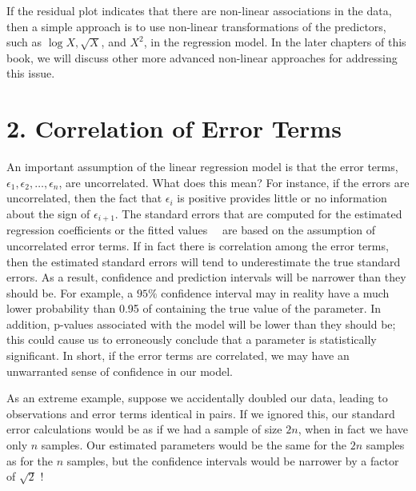 \documentclass[10pt]{article}
\begin{document}
If the residual plot indicates that there are non-linear associations in the data, then a simple approach is to use non-linear transformations of the predictors, such as $\log X, \sqrt{X}$, and $X^{2}$, in the regression model. In the later chapters of this book, we will discuss other more advanced non-linear approaches for addressing this issue.

\section*{2. Correlation of Error Terms}
An important assumption of the linear regression model is that the error terms, $\epsilon_{1}, \epsilon_{2}, \ldots, \epsilon_{n}$, are uncorrelated. What does this mean? For instance, if the errors are uncorrelated, then the fact that $\epsilon_{i}$ is positive provides little or no information about the sign of $\epsilon_{i+1}$. The standard errors that are computed for the estimated regression coefficients or the fitted values\
\
are based on the assumption of uncorrelated error terms. If in fact there is correlation among the error terms, then the estimated standard errors will tend to underestimate the true standard errors. As a result, confidence and prediction intervals will be narrower than they should be. For example, a $95 \%$ confidence interval may in reality have a much lower probability than 0.95 of containing the true value of the parameter. In addition, p-values associated with the model will be lower than they should be; this could cause us to erroneously conclude that a parameter is statistically significant. In short, if the error terms are correlated, we may have an unwarranted sense of confidence in our model.

As an extreme example, suppose we accidentally doubled our data, leading to observations and error terms identical in pairs. If we ignored this, our standard error calculations would be as if we had a sample of size $2 n$, when in fact we have only $n$ samples. Our estimated parameters would be the same for the $2 n$ samples as for the $n$ samples, but the confidence intervals would be narrower by a factor of $\sqrt{2}$ !
\end{document}
